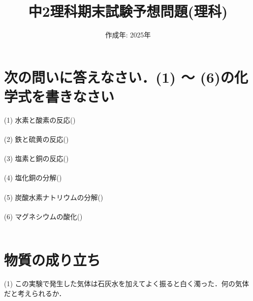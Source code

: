 \documentclass[autodetect-engine,dvi=dvipdfmx,ja=standard,
               a4j,11pt]{bxjsarticle}
\title{中2理科期末試験予想問題(理科)}
\author{}
\date{作成年: 2025年\\}  %
\begin{document}
\maketitle
\section{\textbf{次の問いに答えなさい．(1) ～ (6)の化学式を書きなさい}}
    (1) 水素と酸素の反応()\\\\

    (2) 鉄と硫黄の反応()\\\\

    (3) 塩素と銅の反応()\\\\

    (4) 塩化銅の分解()\\\\

    (5) 炭酸水素ナトリウムの分解()\\\\

    (6) マグネシウムの酸化()\\\\
    \clearpage
\section{物質の成り立ち}
\begin{figure}[htb]
        \centering
        \vspace{20pt} %
        \caption{}
\end{figure}
    (1) この実験で発生した気体は石灰水を加えてよく振ると白く濁った．何の気体だと考えられるか．\\\\
\end{document}
